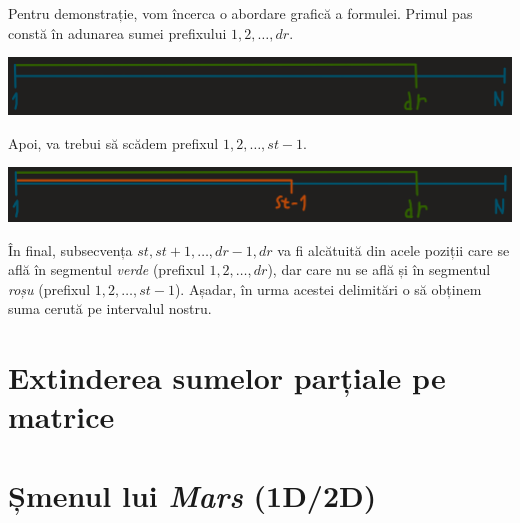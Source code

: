 Pentru demonstrație, vom încerca o abordare grafică a formulei. Primul pas constă în adunarea sumei prefixului $1, 2, \dots, dr$.

\begin{center}
    \includegraphics[width=\textwidth]{images/sumepartiale/sp1.png}
\end{center}

Apoi, va trebui să scădem prefixul $1, 2, \dots, st - 1$.

\begin{center}
    \includegraphics[width=\textwidth]{images/sumepartiale/sp2.png}
\end{center}

În final, subsecvența $st, st + 1, \dots, dr - 1, dr$ va fi alcătuită din acele poziții care se află în segmentul \emph{verde} (prefixul $1, 2, \dots, dr$), dar care nu se află și în segmentul \emph{roșu} (prefixul $1, 2, \dots, st - 1$). Așadar, în urma acestei delimitări o să obținem suma cerută pe intervalul nostru.

\section{Extinderea sumelor parțiale pe matrice}

\section{Șmenul lui \emph{Mars} (1D/2D)}